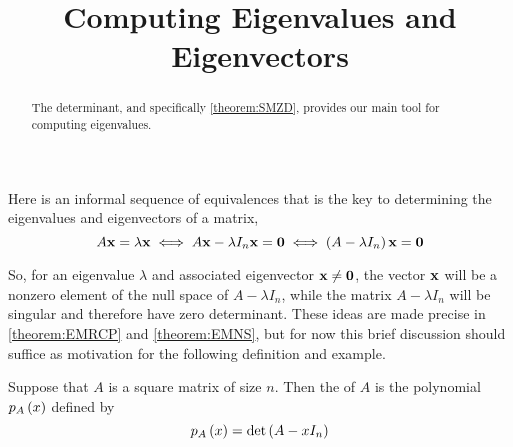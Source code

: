 \documentclass{ximera}
\title{Computing Eigenvalues and Eigenvectors}
\begin{document}
\begin{abstract}
  The determinant, and specifically \ref{theorem:SMZD}, provides our
  main tool for computing eigenvalues.
\end{abstract}
\maketitle

Here is an informal sequence of equivalences that is the key to determining the eigenvalues and eigenvectors of a matrix,
\[
  A\mathbf{x}=\lambda\mathbf{x}\iff
  A\mathbf{x}-\lambda I_n\mathbf{x}=\mathbf{0}\iff
  \left(A-\lambda I_n\right)\mathbf{x}=\mathbf{0}
\]

So, for an eigenvalue $\lambda$ and associated eigenvector
$\mathbf{x}\neq\mathbf{0}$, the vector $\mathbf{x}$ will be a nonzero
element of the null space of $A-\lambda I_n$, while the matrix
$A-\lambda I_n$ will be singular and therefore have zero determinant.
These ideas are made precise in \ref{theorem:EMRCP} and
\ref{theorem:EMNS}, but for now this brief discussion should suffice
as motivation for the following definition and example.

\begin{definition}

  Suppose that $A$ is a square matrix of size $n$.  Then the
   of $A$ is the polynomial
  $p_{A}\left(x\right)$ defined by
  \[
    p_{A}\left(x\right)=\det\left(A-xI_n\right)
  \]

\end{definition}
\end{document}
